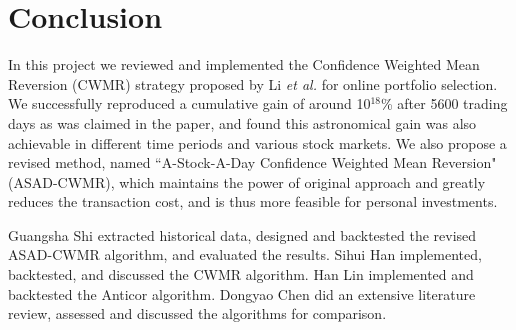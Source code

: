 \section{Conclusion}
In this project we reviewed and implemented the Confidence Weighted Mean Reversion (CWMR) strategy proposed by Li \emph{et al.} for online portfolio selection. We successfully reproduced a cumulative gain of around 10$^{18}$\% after 5600 trading days as was claimed in the paper, and found this astronomical gain was also achievable in different time periods and various stock markets. We also propose a revised method, named ``A-Stock-A-Day Confidence Weighted Mean Reversion" (ASAD-CWMR), which maintains the power of original approach and greatly reduces the transaction cost, and is thus more feasible for personal investments.

Guangsha Shi extracted historical data, designed and backtested the revised ASAD-CWMR algorithm, and evaluated the results. Sihui Han implemented, backtested, and discussed the CWMR algorithm. Han Lin implemented and backtested the Anticor algorithm. Dongyao Chen did an extensive literature review, assessed and discussed the algorithms for comparison.
